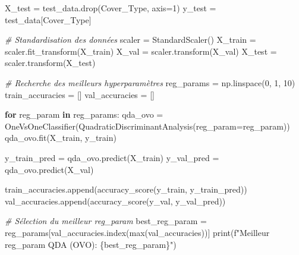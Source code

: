 \documentclass[
  letterpaper,
  DIV=11,
  numbers=noendperiod]{scrartcl}
\newenvironment{Shaded}{}{}
\newcommand{\BuiltInTok}[1]{\textcolor[rgb]{0.00,0.50,0.00}{#1}}
\newcommand{\CommentTok}[1]{\textcolor[rgb]{0.38,0.63,0.69}{\textit{#1}}}
\newcommand{\ControlFlowTok}[1]{\textcolor[rgb]{0.00,0.44,0.13}{\textbf{#1}}}
\newcommand{\DecValTok}[1]{\textcolor[rgb]{0.25,0.63,0.44}{#1}}
\newcommand{\KeywordTok}[1]{\textcolor[rgb]{0.00,0.44,0.13}{\textbf{#1}}}
\newcommand{\NormalTok}[1]{#1}
\newcommand{\OperatorTok}[1]{\textcolor[rgb]{0.40,0.40,0.40}{#1}}
\newcommand{\SpecialCharTok}[1]{\textcolor[rgb]{0.25,0.44,0.63}{#1}}
\newcommand{\SpecialStringTok}[1]{\textcolor[rgb]{0.73,0.40,0.53}{#1}}
\newcommand{\StringTok}[1]{\textcolor[rgb]{0.25,0.44,0.63}{#1}}
\begin{document}
\begin{Shaded}
\begin{Highlighting}[]
\NormalTok{X\_test }\OperatorTok{=}\NormalTok{ test\_data.drop(}\StringTok{\textquotesingle{}Cover\_Type\textquotesingle{}}\NormalTok{, axis}\OperatorTok{=}\DecValTok{1}\NormalTok{)}
\NormalTok{y\_test }\OperatorTok{=}\NormalTok{ test\_data[}\StringTok{\textquotesingle{}Cover\_Type\textquotesingle{}}\NormalTok{]}

\CommentTok{\# Standardisation des données}
\NormalTok{scaler }\OperatorTok{=}\NormalTok{ StandardScaler()}
\NormalTok{X\_train }\OperatorTok{=}\NormalTok{ scaler.fit\_transform(X\_train)}
\NormalTok{X\_val }\OperatorTok{=}\NormalTok{ scaler.transform(X\_val)}
\NormalTok{X\_test }\OperatorTok{=}\NormalTok{ scaler.transform(X\_test)}

\CommentTok{\# Recherche des meilleurs hyperparamètres}
\NormalTok{reg\_params }\OperatorTok{=}\NormalTok{ np.linspace(}\DecValTok{0}\NormalTok{, }\DecValTok{1}\NormalTok{, }\DecValTok{10}\NormalTok{)}
\NormalTok{train\_accuracies }\OperatorTok{=}\NormalTok{ []}
\NormalTok{val\_accuracies }\OperatorTok{=}\NormalTok{ []}

\ControlFlowTok{for}\NormalTok{ reg\_param }\KeywordTok{in}\NormalTok{ reg\_params:}
\NormalTok{    qda\_ovo }\OperatorTok{=}\NormalTok{ OneVsOneClassifier(QuadraticDiscriminantAnalysis(reg\_param}\OperatorTok{=}\NormalTok{reg\_param))}
\NormalTok{    qda\_ovo.fit(X\_train, y\_train)}
    
\NormalTok{    y\_train\_pred }\OperatorTok{=}\NormalTok{ qda\_ovo.predict(X\_train)}
\NormalTok{    y\_val\_pred }\OperatorTok{=}\NormalTok{ qda\_ovo.predict(X\_val)}
    
\NormalTok{    train\_accuracies.append(accuracy\_score(y\_train, y\_train\_pred))}
\NormalTok{    val\_accuracies.append(accuracy\_score(y\_val, y\_val\_pred))}

\CommentTok{\# Sélection du meilleur reg\_param}
\NormalTok{best\_reg\_param }\OperatorTok{=}\NormalTok{ reg\_params[val\_accuracies.index(}\BuiltInTok{max}\NormalTok{(val\_accuracies))]}
\BuiltInTok{print}\NormalTok{(}\SpecialStringTok{f"Meilleur reg\_param QDA (OVO): }\SpecialCharTok{\{}\NormalTok{best\_reg\_param}\SpecialCharTok{\}}\SpecialStringTok{"}\NormalTok{)}


\end{Highlighting}
\end{Shaded}
\end{document}
